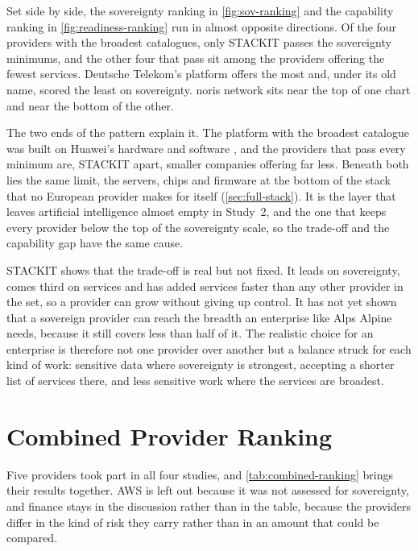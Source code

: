 Set side by side, the sovereignty ranking in \cref{fig:sov-ranking} and the
capability ranking in \cref{fig:readiness-ranking} run in almost opposite
directions. Of the four providers with the broadest catalogues, only STACKIT
passes the sovereignty minimums, and the other four that pass sit among the
providers offering the fewest services. Deutsche Telekom's platform offers the
most and, under its old name, scored the least on sovereignty. noris network sits
near the top of one chart and near the bottom of the other.

The two ends of the pattern explain it. The platform with the broadest catalogue
was built on Huawei's hardware and software
\cite{OTC_GoesLive_2016,LightReading_DT_2025}, and the providers that pass every
minimum are, STACKIT apart, smaller companies offering far less. Beneath both lies
the same limit, the servers, chips and firmware at the bottom of the stack that no
European provider makes for itself (\cref{sec:full-stack}). It is the layer that
leaves artificial intelligence almost empty in Study~2, and the one that keeps
every provider below the top of the sovereignty scale, so the trade-off and the
capability gap have the same cause.

STACKIT shows that the trade-off is real but not fixed. It leads on sovereignty,
comes third on services and has added services faster than any other provider in
the set, so a provider can grow without giving up control. It has not yet shown
that a sovereign provider can reach the breadth an enterprise like Alps Alpine
needs, because it still covers less than half of it. The realistic choice for an
enterprise is therefore not one provider over another but a balance struck for
each kind of work: sensitive data where sovereignty is strongest, accepting a
shorter list of services there, and less sensitive work where the services are
broadest.

\section{Combined Provider Ranking}
\label{sec:combined-ranking}

Five providers took part in all four studies, and \cref{tab:combined-ranking}
brings their results together. \acs{AWS} is left out because it was not assessed
for sovereignty, and finance stays in the discussion rather than in the table,
because the providers differ in the kind of risk they carry rather than in an
amount that could be compared.

